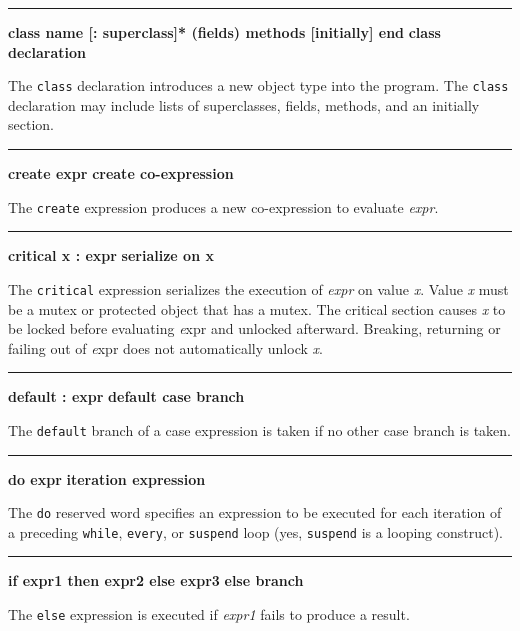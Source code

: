 \bigskip\hrule\vspace{0.1cm}
\noindent
{\bf \textbf{class} name [: superclass]* (fields) methods [initially] end } \hfill {\bf class declaration}

\noindent
{}The \texttt{class} declaration introduces a new
object type into the program. The \texttt{class} declaration may
include lists of superclasses, fields, methods, and an
initially section.

\bigskip\hrule\vspace{0.1cm}
\noindent
{\bf create expr } \hfill {\bf create co{}-expression}

\noindent
{}The \texttt{create} expression produces a new
co-expression to evaluate \textit{expr}.

\bigskip\hrule\vspace{0.1cm}
\noindent
{\bf critical x : expr } \hfill {\bf serialize on x}

\noindent
{}The \texttt{critical} expression serializes the
execution of \textit{expr} on value {\textit x}. Value {\textit x} must
be a mutex or protected object that has a mutex. The critical section
causes {\textit x} to be locked before evaluating {\textit expr} and
unlocked afterward. Breaking, returning or failing out of {\textit expr} 
does not automatically unlock {\textit x}.\WarningNotThreadSafe

\bigskip\hrule\vspace{0.1cm}
\noindent
{\bf default : expr } \hfill {\bf default case branch}

\noindent
{}The \texttt{default} branch of a case
expression is taken if no other case branch is taken.

\bigskip\hrule\vspace{0.1cm}
\noindent
{\bf do expr } \hfill {\bf iteration expression}

\noindent
{}The \texttt{do} reserved word specifies an
expression to be executed for each iteration of a preceding
\texttt{while}, \texttt{every}, or \texttt{suspend} loop (yes,
\texttt{suspend} is a looping construct).

\bigskip\hrule\vspace{0.1cm}
\noindent
{\bf if expr1 then expr2 else expr3 } \hfill {\bf else branch}

\noindent
{}The \texttt{else} expression is executed if \textit{expr1}
fails to produce a result.

